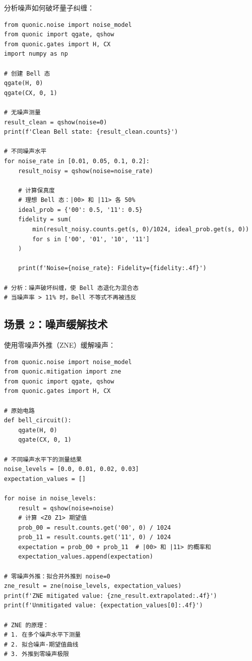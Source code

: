 \documentclass[12pt,a4paper]{article}
\begin{document}
分析噪声如何破坏量子纠缠：

\begin{verbatim}
from quonic.noise import noise_model
from quonic import qgate, qshow
from quonic.gates import H, CX
import numpy as np

# 创建 Bell 态
qgate(H, 0)
qgate(CX, 0, 1)

# 无噪声测量
result_clean = qshow(noise=0)
print(f'Clean Bell state: {result_clean.counts}')

# 不同噪声水平
for noise_rate in [0.01, 0.05, 0.1, 0.2]:
    result_noisy = qshow(noise=noise_rate)

    # 计算保真度
    # 理想 Bell 态：|00> 和 |11> 各 50%
    ideal_prob = {'00': 0.5, '11': 0.5}
    fidelity = sum(
        min(result_noisy.counts.get(s, 0)/1024, ideal_prob.get(s, 0))
        for s in ['00', '01', '10', '11']
    )

    print(f'Noise={noise_rate}: Fidelity={fidelity:.4f}')

# 分析：噪声破坏纠缠，使 Bell 态退化为混合态
# 当噪声率 > 11% 时，Bell 不等式不再被违反
\end{verbatim}

\subsection{场景 2：噪声缓解技术}

使用零噪声外推（ZNE）缓解噪声：

\begin{verbatim}
from quonic.noise import noise_model
from quonic.mitigation import zne
from quonic import qgate, qshow
from quonic.gates import H, CX

# 原始电路
def bell_circuit():
    qgate(H, 0)
    qgate(CX, 0, 1)

# 不同噪声水平下的测量结果
noise_levels = [0.0, 0.01, 0.02, 0.03]
expectation_values = []

for noise in noise_levels:
    result = qshow(noise=noise)
    # 计算 <Z0 Z1> 期望值
    prob_00 = result.counts.get('00', 0) / 1024
    prob_11 = result.counts.get('11', 0) / 1024
    expectation = prob_00 + prob_11  # |00> 和 |11> 的概率和
    expectation_values.append(expectation)

# 零噪声外推：拟合并外推到 noise=0
zne_result = zne(noise_levels, expectation_values)
print(f'ZNE mitigated value: {zne_result.extrapolated:.4f}')
print(f'Unmitigated value: {expectation_values[0]:.4f}')

# ZNE 的原理：
# 1. 在多个噪声水平下测量
# 2. 拟合噪声-期望值曲线
# 3. 外推到零噪声极限
\end{verbatim}
\end{document}
